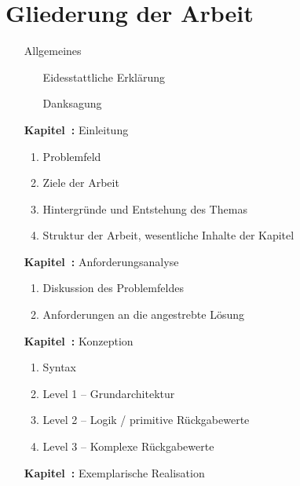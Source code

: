 \section{Gliederung der Arbeit}
\label{sec:gliederung_der_arbeit}
  \begin{enumerate}[
    labelindent=*,
    leftmargin=\widthof{\textbf{~~Kapitel~0:~}},
    label=\arabic*.
  ]
    \item[]
      Allgemeines
      \begin{enumerate}[label=\theenumi\arabic*.]
          \item[]
            Eidesstattliche Erklärung
          \item[]
            Danksagung
      \end{enumerate}
    \item[\textbf{Kapitel~\arabic{enumi}:}]
      Einleitung
      \begin{enumerate}[label=\theenumi\arabic*.]
          \item Problemfeld
          \item Ziele der Arbeit
          \item Hintergründe und Entstehung des Themas
          \item Struktur der Arbeit, wesentliche Inhalte der Kapitel
      \end{enumerate}
    \item[\textbf{Kapitel~\arabic{enumi}:}]
      Anforderungsanalyse
      \begin{enumerate}[label=\theenumi\arabic*.]
          \item Diskussion des Problemfeldes
          \item Anforderungen an die angestrebte Lösung
      \end{enumerate}
    \item[\textbf{Kapitel~\arabic{enumi}:}]
      Konzeption
      \begin{enumerate}[label=\theenumi\arabic*.]
          \item Syntax
          \item Level 1 -- Grundarchitektur
          \item Level 2 -- Logik / primitive Rückgabewerte
          \item Level 3 -- Komplexe Rückgabewerte
      \end{enumerate}
    \item[\textbf{Kapitel~\arabic{enumi}:}]
      Exemplarische Realisation

\end{enumerate}
